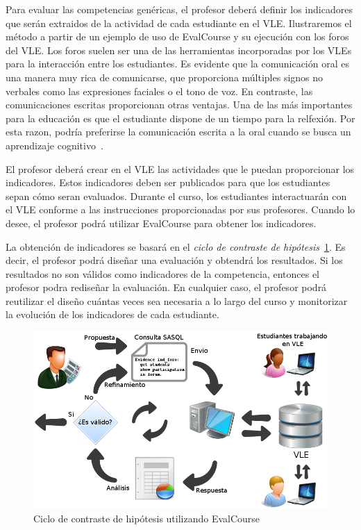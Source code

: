 Para evaluar las competencias genéricas, el profesor deberá definir los indicadores que serán extraidos de la actividad de cada estudiante en el VLE. Ilustraremos el método a partir de un ejemplo de uso de EvalCourse y su ejecución con los foros del VLE. Los foros suelen ser una de las herramientas incorporadas por los VLEs para la interacción entre los estudiantes. Es evidente que la comunicación oral es una manera muy rica de comunicarse, que proporciona múltiples signos no verbales como las expresiones faciales o el tono de voz. En contraste, las comunicaciones escritas proporcionan otras ventajas. Una de las más importantes para la educación es que el estudiante dispone de un tiempo para la relfexión. Por esta razon, podría preferirse la comunicación escrita a la oral cuando se busca un aprendizaje cognitivo~\cite{garrison1999critical}.

El profesor deberá crear en el VLE las actividades que le puedan proporcionar los indicadores. Estos indicadores deben ser publicados para que los estudiantes sepan cómo seran evaluados. Durante el curso, los estudiantes interactuarán con el VLE conforme a las instrucciones proporcionadas por sus profesores. Cuando lo desee, el profesor podrá utilizar EvalCourse para obtener los indicadores.

La obtención de indicadores se basará en el \emph{ciclo de contraste de hipótesis}~\ref{fig:EVCDiagram}. Es decir, el profesor podrá diseñar una evaluación y obtendrá los resultados. Si los resultados no son válidos como indicadores de la competencia, entonces el profesor podra rediseñar la evaluación. En cualquier caso, el profesor podrá reutilizar el diseño cuántas veces sea necesaria a lo largo del curso y monitorizar la evolución de los indicadores de cada estudiante.

\begin{figure}
  \begin{center}
    \includegraphics[scale=0.45]{EvcDiagram.png}
  \end{center}
  \caption{Ciclo de contraste de hipótesis utilizando EvalCourse}
  \label{fig:EVCDiagram}
\end{figure}


